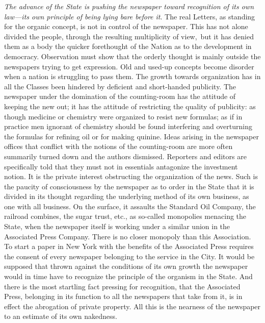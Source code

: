 \documentclass[openany,nobib]{tufte-book}
\begin{document}
\vspace{0.05in}

\emph{The advance of the State is pushing the newspaper toward
recognition of its own law---its own principle of being lying bare
before it}. The real Letters, as standing for the organic concept, is
not in control of the newspaper. This has not alone divided the people,
through the resulting multiplicity of view,~but it has denied them as a
body the quicker forethought of the Nation as to the development in
democracy. Observation must show that the orderly thought is mainly
outside the newspapers trying to get expression. Old and used-up
concepts become disorder when a nation is struggling to pass them. The
growth towards organization has in all the Classes been hindered by
deficient and short-handed publicity. The newspaper under the domination
of the counting-room has the attitude of keeping the new out; it has the
attitude of restricting the quality of publicity: as though medicine or
chemistry were organized to resist new formulas; as if in practice men
ignorant of chemistry should be found interfering and overturning the
formulas for refining oil or for making quinine. Ideas arising in the
newspaper offices that conflict with the notions of the counting-room
are more often summarily turned down and the authors dismissed.
Reporters and editors are specifically told that they must not in
essentials antagonize the investment notion. It is the private interest
obstructing the organization of the news. Such is the paucity of
consciousness by the newspaper as to order in the State that it is
divided in its thought regarding the underlying method of its own
business, as one with all business. On the surface, it assaults the
Standard Oil Company, the railroad combines, the sugar trust, etc., as
so-called monopolies menacing the State, when the newspaper itself is
working under a similar union in the Associated Press Company. There is
no closer monopoly than this Association. To start a paper in New York
with the benefits of the Associated Press requires the consent of every
newspaper belonging to the service in the City. It would be supposed
that thrown against the conditions of its own growth the newspaper would
in time have to recognize the principle of the organism in the State.
And there is the most startling fact pressing for recognition, that the
Associated Press, belonging in its function to all the newspapers that
take from it, is in effect the abrogation of private property. All this
is the nearness of the newspaper to an estimate of its own nakedness.~
\end{document}
